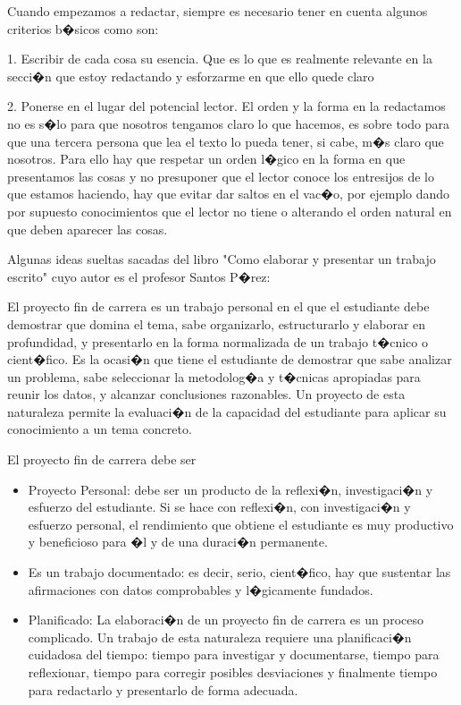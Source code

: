 \documentclass[12pt,letter,spanish]{book}
\begin{document}
Cuando empezamos a redactar, siempre es necesario tener en cuenta algunos criterios b�sicos como son:

1. Escribir de cada cosa su esencia. Que es lo que es realmente relevante en la secci�n que estoy redactando y esforzarme
en que ello quede claro

2. Ponerse en el lugar del potencial lector. El orden y la forma en la redactamos no es s�lo para que nosotros tengamos
claro lo que hacemos, es sobre todo para que una tercera persona que lea el texto lo pueda tener, si cabe, m�s claro
que nosotros. Para ello hay que respetar un orden l�gico en la forma en que presentamos las cosas y no presuponer que
el lector conoce los entresijos de lo que estamos haciendo, hay que evitar dar saltos en el vac�o, por ejemplo dando
por supuesto conocimientos que el lector no tiene o alterando el orden natural en que deben aparecer las cosas.

Algunas ideas sueltas sacadas del libro "Como elaborar y presentar un trabajo escrito" cuyo autor es el profesor Santos P�rez:

El proyecto fin de carrera es un trabajo personal en el que el estudiante debe demostrar que domina el tema, sabe organizarlo,
estructurarlo y elaborar en profundidad, y presentarlo en la forma normalizada de un trabajo t�cnico o cient�fico. Es la
ocasi�n que tiene el estudiante de demostrar que sabe analizar un problema, sabe seleccionar la metodolog�a y t�cnicas
apropiadas para reunir los datos, y alcanzar conclusiones razonables. Un proyecto de esta naturaleza permite la evaluaci�n
de la capacidad del estudiante para aplicar su conocimiento a un tema concreto.

El proyecto fin de carrera debe ser
\begin{itemize}
\item  Proyecto Personal: debe ser un producto de la reflexi�n, investigaci�n y esfuerzo del estudiante. Si se hace con
       reflexi�n, con investigaci�n y esfuerzo personal, el rendimiento que obtiene el estudiante es muy productivo y
       beneficioso para �l y de una duraci�n permanente.
\item  Es un trabajo documentado: es decir, serio, cient�fico, hay que sustentar las afirmaciones con datos comprobables
       y l�gicamente fundados.
\item  Planificado: La elaboraci�n de un proyecto fin de carrera es un proceso complicado. Un trabajo de esta naturaleza
       requiere una planificaci�n cuidadosa del tiempo: tiempo para investigar y documentarse, tiempo para reflexionar,
       tiempo para corregir posibles desviaciones y finalmente tiempo para redactarlo y presentarlo de forma adecuada.
\end{itemize}
\end{document}
